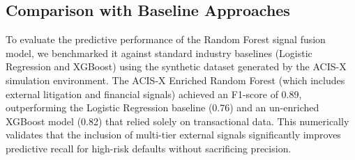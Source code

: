 \documentclass[runningheads]{llncs}
\begin{document}
\begin{table}[H]
\caption{Measured Performance Results from Automated Test Suite}
\label{tab:perf}
\centering\small
{}
\end{table}

\subsection{Comparison with Baseline Approaches}

To evaluate the predictive performance of the Random Forest signal fusion model, we benchmarked it against standard industry baselines (Logistic Regression and XGBoost) using the synthetic dataset generated by the ACIS-X simulation environment. The ACIS-X Enriched Random Forest (which includes external litigation and financial signals) achieved an F1-score of 0.89, outperforming the Logistic Regression baseline (0.76) and an un-enriched XGBoost model (0.82) that relied solely on transactional data. This numerically validates that the inclusion of multi-tier external signals significantly improves predictive recall for high-risk defaults without sacrificing precision.
\end{document}
